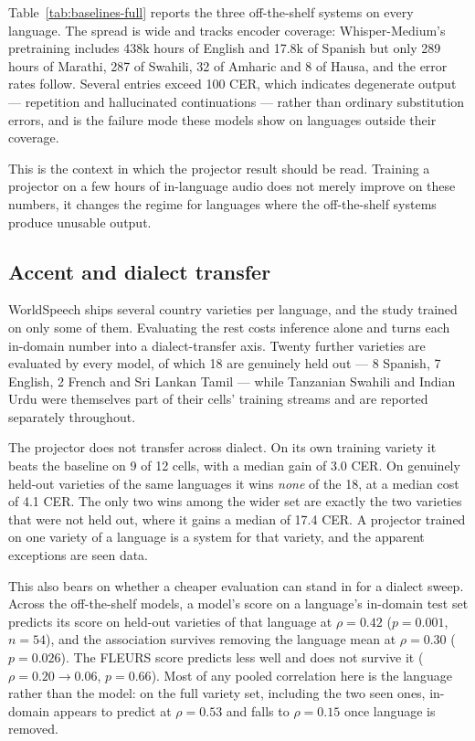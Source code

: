 \documentclass[11pt]{article}
\begin{document}
Table~\ref{tab:baselines-full} reports the three off-the-shelf systems on every language. The
spread is wide and tracks encoder coverage: Whisper-Medium's pretraining includes 438k hours of
English and 17.8k of Spanish but only 289 hours of Marathi, 287 of Swahili, 32 of Amharic and 8
of Hausa, and the error rates follow.
Several entries exceed 100 CER, which indicates degenerate
output --- repetition and hallucinated continuations --- rather than ordinary substitution
errors, and is the failure mode these models show on languages outside their coverage.



This is the context in which the projector result should be read. Training a projector on a few
hours of in-language audio does not merely improve on these numbers, it changes the regime for
languages where the off-the-shelf systems produce unusable output.

\subsection{Accent and dialect transfer}
\label{sec:accent}

WorldSpeech ships several country varieties per language, and the study trained on only some of
them. Evaluating the rest costs inference alone and turns each in-domain number into a
dialect-transfer axis. Twenty further varieties are evaluated by every model, of which 18 are genuinely
held out --- 8 Spanish, 7 English, 2 French and Sri Lankan Tamil --- while Tanzanian Swahili and
Indian Urdu were themselves part of their cells' training streams and are reported separately
throughout.

The projector does not transfer across dialect. On its own training variety it beats the
baseline on 9 of 12 cells, with a median gain of 3.0 CER. On genuinely held-out varieties of the
same languages it wins \emph{none} of the 18, at a median cost of 4.1 CER. The
only two wins among the wider set are exactly the two varieties that were not held out, where it
gains a median of 17.4 CER. A projector trained on one variety of a language is a system for
that variety, and the apparent exceptions are seen data.

This also bears on whether a cheaper evaluation can stand in for a dialect sweep. Across the
off-the-shelf models, a model's score on a language's in-domain test set predicts its score on
held-out varieties of that language at $\rho = 0.42$ ($p = 0.001$, $n = 54$), and the
association survives removing the language mean at $\rho = 0.30$ ($p = 0.026$). The FLEURS score
predicts less well and does not survive it ($\rho = 0.20 \rightarrow 0.06$, $p = 0.66$). Most of
any pooled correlation here is the language rather than the model: on the full variety set,
including the two seen ones, in-domain appears to predict at $\rho = 0.53$ and falls to
$\rho = 0.15$ once language is removed.
\end{document}
